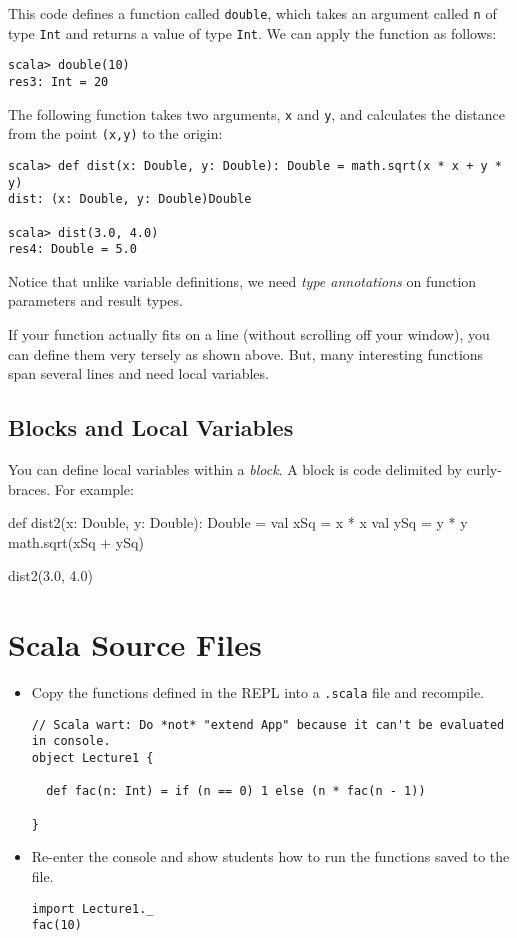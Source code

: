 \documentclass{book}
\begin{document}
This code defines a function called \verb|double|, which takes an argument called
\verb|n| of type \verb|Int| and returns a value of type \verb|Int|. We can apply the
function as follows:

\begin{verbatim}
scala> double(10)
res3: Int = 20
\end{verbatim}

The following function takes two arguments, \verb|x| and \verb|y|, and calculates the
distance from the point \verb|(x,y)| to the origin:

\begin{verbatim}
scala> def dist(x: Double, y: Double): Double = math.sqrt(x * x + y * y)
dist: (x: Double, y: Double)Double

scala> dist(3.0, 4.0)
res4: Double = 5.0
\end{verbatim}

Notice that unlike variable definitions, we need \emph{type annotations}
on function parameters and result types.

If your function actually fits on a line (without scrolling off your window),
you can define them very tersely as shown above. But, many interesting
functions span several lines and need local variables.

\subsection{Blocks and Local Variables}

You can define local variables within a \emph{block}. A block is code delimited by
curly-braces. For example:

\begin{scalacode}
def dist2(x: Double, y: Double): Double = {
  val xSq = x * x
  val ySq = y * y
  math.sqrt(xSq + ySq)
}

dist2(3.0, 4.0)
\end{scalacode}

\section{Scala Source Files}


\begin{itemize}


\item Copy the functions defined in the REPL into a \verb|.scala| file and
 recompile.

\begin{verbatim}
// Scala wart: Do *not* "extend App" because it can't be evaluated in console.
object Lecture1 {

  def fac(n: Int) = if (n == 0) 1 else (n * fac(n - 1))

}
\end{verbatim}

\item Re-enter the console and show students how to run the functions saved
to the file.

\begin{verbatim}
import Lecture1._
fac(10)
\end{verbatim}

\end{itemize}
\end{document}

